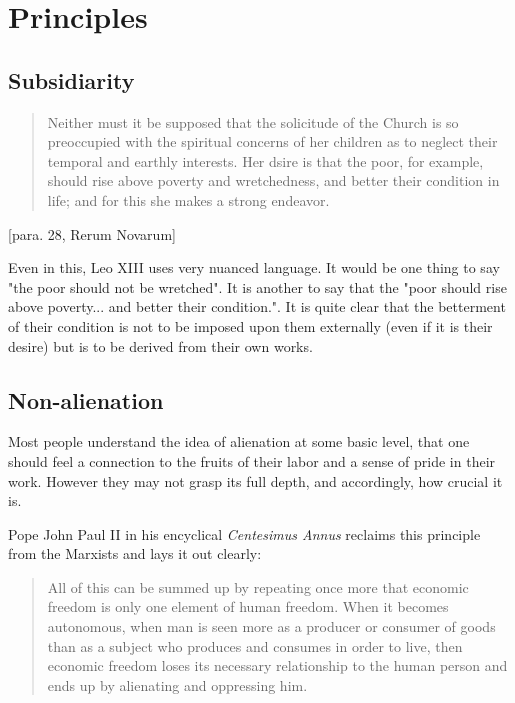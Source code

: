 \documentclass[letterpaper]{article}
\begin{document}
\section{Principles}

\subsection{Subsidiarity}

\begin{quote}
  Neither must it be supposed that the solicitude of the Church is so preoccupied with the spiritual concerns of her children as to neglect their temporal and earthly interests. Her dsire is that the poor, for example, should rise above poverty and wretchedness, and better their condition in life; and for this she makes a strong endeavor.
\end{quote} [para. 28, Rerum Novarum]

Even in this, Leo XIII uses very nuanced language. It would be one thing to say "the poor should not be wretched". It is another to say that the "poor should rise above poverty... and better their condition.".  It is quite clear that the betterment of their condition is not to be imposed upon them externally (even if it is their desire) but is to be derived from their own works.

\subsection{Non-alienation}

Most people understand the idea of alienation at some basic level, that one should feel a connection to the fruits of their labor and a sense of pride in their work. However they may not grasp its full depth, and accordingly, how crucial it is.

Pope John Paul II in his encyclical \textit{Centesimus Annus} reclaims this principle from the Marxists and lays it out clearly:

\begin{quote}
  All of this can be summed up by repeating once more that economic freedom is only one element of human freedom. When it becomes autonomous, when man is seen more as a producer or consumer of goods than as a subject who produces and consumes in order to live, then economic freedom loses its necessary relationship to the human person and ends up by alienating and oppressing him.
\end{quote}
\end{document}
